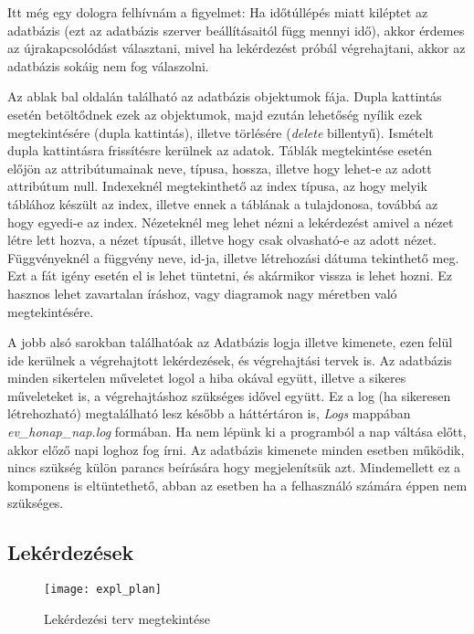 Itt még egy dologra felhívnám a figyelmet: Ha időtúllépés miatt kiléptet az adatbázis (ezt az adatbázis szerver beállításaitól függ mennyi idő), akkor
érdemes az újrakapcsolódást választani, mivel ha lekérdezést próbál végrehajtani, akkor az adatbázis sokáig nem fog válaszolni.

Az ablak bal oldalán található az adatbázis objektumok fája. Dupla kattintás esetén betöltődnek ezek az objektumok, majd ezután lehetőség nyílik ezek megtekintésére
(dupla kattintás), illetve törlésére (\textit{delete} billentyű). Ismételt dupla kattintásra frissítésre kerülnek az adatok. Táblák megtekintése esetén előjön az
attribútumainak neve, típusa, hossza, illetve hogy lehet-e az adott attribútum null. Indexeknél megtekinthető az index típusa, az hogy melyik táblához készült az index, illetve
ennek a táblának a tulajdonosa, továbbá az hogy egyedi-e az index. Nézeteknél meg lehet nézni a lekérdezést amivel a nézet létre lett hozva, a nézet típusát, illetve
hogy csak olvasható-e az adott nézet. Függvényeknél a függvény neve, id-ja, illetve létrehozási dátuma tekinthető meg. Ezt a fát igény esetén el is lehet tüntetni,
és akármikor vissza is lehet hozni. Ez hasznos lehet zavartalan íráshoz, vagy diagramok nagy méretben való megtekintésére.

A jobb alsó sarokban találhatóak az Adatbázis logja illetve kimenete, ezen felül ide kerülnek a végrehajtott lekérdezések, és végrehajtási tervek is. Az adatbázis minden
sikertelen műveletet logol a hiba okával együtt, illetve a sikeres műveleteket is, a végrehajtáshoz szükséges idővel együtt. Ez a log (ha sikeresen létrehozható) megtalálható
lesz később a háttértáron is, \textit{Logs} mappában \textit{ev\_honap\_nap.log} formában. Ha nem lépünk ki a programból a nap váltása előtt, akkor előző napi loghoz fog írni. Az adatbázis
kimenete minden esetben működik, nincs szükség külön parancs beírására hogy megjelenítsük azt. Mindemellett ez a komponens is eltüntethető, abban az esetben ha a felhasználó számára éppen nem
szükséges.

\subsection{Lekérdezések}

\begin{figure}[ht]
  \begin{center}
  \texttt{[image: expl\_plan]}
  \end{center}
 \caption{Lekérdezési terv megtekintése}
\end{figure}

